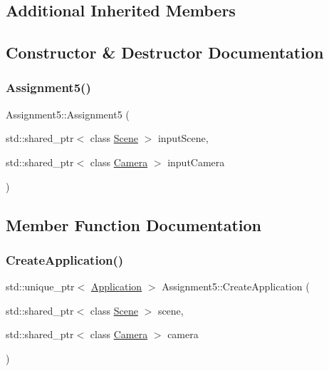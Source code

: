 \subsection*{Additional Inherited Members}


\subsection{Constructor \& Destructor Documentation}
\hypertarget{class_assignment5_aee966f6188c377fd831e6edb97d1ee08}{}\label{class_assignment5_aee966f6188c377fd831e6edb97d1ee08}
\subsubsection{\texorpdfstring{Assignment5()}{Assignment5()}}
{\footnotesize\ttfamily Assignment5\+::\+Assignment5 (\begin{DoxyParamCaption}\item[{std\+::shared\+\_\+ptr$<$ class \hyperlink{class_scene}{Scene} $>$}]{input\+Scene,  }\item[{std\+::shared\+\_\+ptr$<$ class \hyperlink{class_camera}{Camera} $>$}]{input\+Camera }\end{DoxyParamCaption})}



\subsection{Member Function Documentation}
\hypertarget{class_assignment5_a1b720b74cc23d4f64ced6d2867f2ac63}{}\label{class_assignment5_a1b720b74cc23d4f64ced6d2867f2ac63}
\subsubsection{\texorpdfstring{Create\+Application()}{CreateApplication()}}
{\footnotesize\ttfamily std\+::unique\+\_\+ptr$<$ \hyperlink{class_application}{Application} $>$ Assignment5\+::\+Create\+Application (\begin{DoxyParamCaption}\item[{std\+::shared\+\_\+ptr$<$ class \hyperlink{class_scene}{Scene} $>$}]{scene,  }\item[{std\+::shared\+\_\+ptr$<$ class \hyperlink{class_camera}{Camera} $>$}]{camera }\end{DoxyParamCaption})\hspace{0.3cm}{\ttfamily [static]}}

